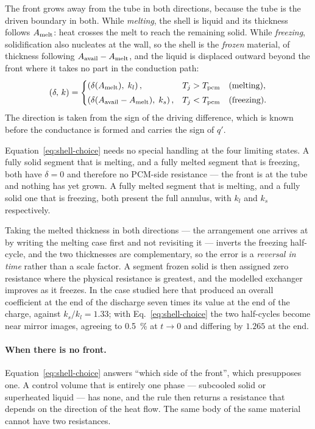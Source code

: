 The front grows away from the tube in both directions, because the tube is the
driven boundary in both. While \emph{melting}, the shell is liquid and its
thickness follows $A_{\mathrm{melt}}$: heat crosses the melt to reach the remaining solid.
While \emph{freezing}, solidification also nucleates at the wall, so the shell
is the \emph{frozen} material, of thickness following $A_{\mathrm{avail}}-A_{\mathrm{melt}}$, and the
liquid is displaced outward beyond the front where it takes no part in the
conduction path:
\begin{equation}
  \left(\delta,\,k\right) =
  \begin{cases}
    \left(\delta(A_{\mathrm{melt}}),\; k_{l}\right), & T_{j} > T_{\mathrm{pcm}} \quad\text{(melting)},\\[3pt]
    \left(\delta(A_{\mathrm{avail}}-A_{\mathrm{melt}}),\; k_{s}\right), & T_{j} < T_{\mathrm{pcm}} \quad\text{(freezing)}.
  \end{cases}
  \label{eq:shell-choice}
\end{equation}
The direction is taken from the sign of the driving difference, which is known
before the conductance is formed and carries the sign of $q'$.

Equation~\eqref{eq:shell-choice} needs no special handling at the four limiting
states. A fully solid segment that is melting, and a fully melted segment that
is freezing, both have $\delta=0$ and therefore no PCM-side resistance --- the
front is at the tube and nothing has yet grown. A fully melted segment that is
melting, and a fully solid one that is freezing, both present the full annulus,
with $k_{l}$ and $k_{s}$ respectively.

Taking the melted thickness in both directions --- the arrangement one arrives at
by writing the melting case first and not revisiting it --- inverts the
freezing half-cycle, and the two thicknesses are complementary, so the error is
a \emph{reversal in time} rather than a scale factor. A segment frozen solid is
then assigned zero resistance where the physical resistance is greatest, and the
modelled exchanger improves as it freezes. In the case studied here that
produced an overall coefficient at the end of the discharge seven times its
value at the end of the charge, against $k_{s}/k_{l}=1.33$; with
Eq.~\eqref{eq:shell-choice} the two half-cycles become near mirror images,
agreeing to \SI{0.5}{\percent} at $t\to0$ and differing by $1.265$ at the end.

\paragraph{When there is no front.}
Equation~\eqref{eq:shell-choice} answers ``which side of the front'', which
presupposes one. A control volume that is entirely one phase --- subcooled solid
or superheated liquid --- has none, and the rule then returns a resistance that
depends on the direction of the heat flow. The same body of the same material
cannot have two resistances.

